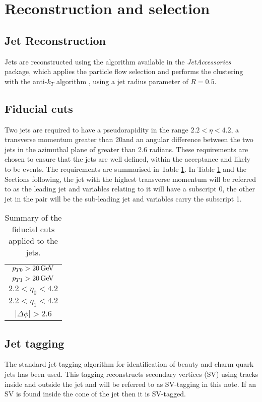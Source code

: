 \section{Reconstruction and selection}
\label{sec:reco}
\subsection{Jet Reconstruction}
Jets are reconstructed using the algorithm available in the \textit{JetAccessories} package, which applies the particle flow selection and performs the clustering with the anti-$k_T$ algorithm \cite{Cacciari:2008gp}, using a jet radius parameter of $R = 0.5$.

\subsection{Fiducial cuts}
Two jets are required to have a pseudorapidity in the range $2.2 < \eta < 4.2$, a transverse momentum greater than 20\gev and an angular difference between the two jets in the azimuthal plane of greater than 2.6 radians. These requirements are chosen to ensure that the jets are well defined, within the \lhcb acceptance and likely to be \bbbar events. The requirements are summarised in Table \ref{tab:fiducial}. In Table \ref{tab:fiducial} and the Sections following, the jet with the highest transverse momentum will be referred to as the leading jet and variables relating to it will have a subscript 0, the other jet in the pair will be the sub-leading jet and variables carry the subscript 1.

\begin{table}[tbh]
\begin{center}
\begin{tabular}{ c } 
 \hline
 $p_{T0}>20\text{\,Ge\kern -0.1em V}$ \\ 
 $p_{T1}>20\text{\,Ge\kern -0.1em V}$ \\ 
 $2.2<\eta_0<4.2$ \\
 $2.2<\eta_1<4.2$ \\
 $|\Delta \phi| > 2.6$ \\
 \hline
\end{tabular}
\caption{\label{tab:fiducial}Summary of the fiducial cuts applied to the jets.}
\end{center}
\end{table}

\subsection{Jet tagging} \label{subsec:jet_tag}
The standard \lhcb jet tagging algorithm \cite{LHCb-PAPER-2015-016} for identification of beauty and charm quark jets has been used. This tagging reconstructs secondary vertices (SV) using tracks inside and outside the jet and will be referred to as SV-tagging in this note. If an SV is found inside the cone of the jet then it is SV-tagged.

